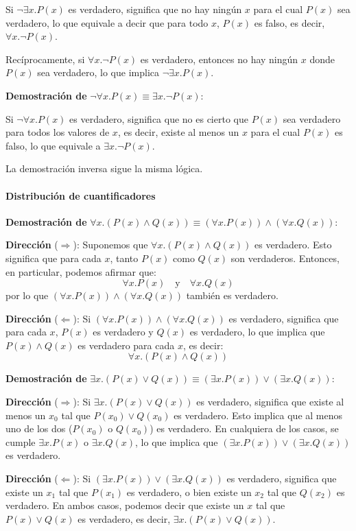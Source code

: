 Si $\lnot \exists x. P(x)$ es verdadero, significa que no hay ningún $x$ para el cual $P(x)$ sea verdadero, lo que equivale a decir que para todo $x$, $P(x)$ es falso, es decir, $\forall x. \lnot P(x)$.

Recíprocamente, si $\forall x. \lnot P(x)$ es verdadero, entonces no hay ningún $x$ donde $P(x)$ sea verdadero, lo que implica $\lnot \exists x. P(x)$.

\textbf{Demostración de} $\lnot \forall x. P(x) \equiv \exists x. \lnot P(x)$:

Si $\lnot \forall x. P(x)$ es verdadero, significa que no es cierto que $P(x)$ sea verdadero para todos los valores de $x$, es decir, existe al menos un $x$ para el cual $P(x)$ es falso, lo que equivale a $\exists x. \lnot P(x)$.

La demostración inversa sigue la misma lógica.

\paragraph{Distribución de cuantificadores}
\textbf{Demostración de} $\forall x. (P(x) \land Q(x)) \equiv (\forall x. P(x)) \land (\forall x. Q(x))$:

\textbf{Dirección} ($\Rightarrow$): Suponemos que $\forall x. (P(x) \land Q(x))$ es verdadero. Esto significa que para cada $x$, tanto $P(x)$ como $Q(x)$ son verdaderos. Entonces, en particular, podemos afirmar que:
\[
\forall x. P(x) \quad \text{y} \quad \forall x. Q(x)
\]
por lo que $(\forall x. P(x)) \land (\forall x. Q(x))$ también es verdadero.

\textbf{Dirección} ($\Leftarrow$): Si $(\forall x. P(x)) \land (\forall x. Q(x))$ es verdadero, significa que para cada $x$, $P(x)$ es verdadero y $Q(x)$ es verdadero, lo que implica que $P(x) \land Q(x)$ es verdadero para cada $x$, es decir:
\[
\forall x. (P(x) \land Q(x))
\]

\textbf{Demostración de} $\exists x. (P(x) \lor Q(x)) \equiv (\exists x. P(x)) \lor (\exists x. Q(x))$:

\textbf{Dirección} ($\Rightarrow$): Si $\exists x. (P(x) \lor Q(x))$ es verdadero, significa que existe al menos un $x_0$ tal que $P(x_0) \lor Q(x_0)$ es verdadero. Esto implica que al menos uno de los dos ($P(x_0)$ o $Q(x_0)$) es verdadero. En cualquiera de los casos, se cumple $\exists x. P(x)$ o $\exists x. Q(x)$, lo que implica que $(\exists x. P(x)) \lor (\exists x. Q(x))$ es verdadero.

\textbf{Dirección} ($\Leftarrow$): Si $(\exists x. P(x)) \lor (\exists x. Q(x))$ es verdadero, significa que existe un $x_1$ tal que $P(x_1)$ es verdadero, o bien existe un $x_2$ tal que $Q(x_2)$ es verdadero. En ambos casos, podemos decir que existe un $x$ tal que $P(x) \lor Q(x)$ es verdadero, es decir, $\exists x. (P(x) \lor Q(x))$.

